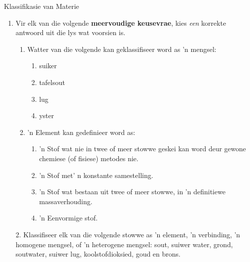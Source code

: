 \label{m38706*secfhsst!!!underscore!!!id672}
            \begin{eocexercises}{Klassifikasie van Materie}{
            \nopagebreak
      \label{m38706*id67920}\begin{enumerate}[noitemsep, label=\textbf{\arabic*}. ] 
            \label{m38706*uid133}\item Vir elk van die volgende \textbf{meervoudige keusevrae}, kies \textsl{een} korrekte
          antwoord uit die lys wat voorsien is.
\label{m38706*id67947}\begin{enumerate}[noitemsep, label=\textbf{\alph*}. ] 
            \label{m38706*uid134}\item Watter van die volgende kan geklassifiseer word as 'n mengsel:
\label{m38706*id67963}\begin{enumerate}[noitemsep, label=\textbf{\roman*}. ] 
            \label{m38706*uid135}\item suiker
\label{m38706*uid136}\item tafelsout
\label{m38706*uid137}\item lug
\label{m38706*uid138}\item yster
\end{enumerate}
                \label{m38706*uid139}\item 'n Element kan gedefinieer word as:
\label{m38706*id68029}\begin{enumerate}[noitemsep, label=\textbf{\roman*}.] 
            \label{m38706*uid140}\item 'n Stof wat nie in twee of meer stowwe geskei kan word deur gewone chemiese (of fisiese) metodes nie.
\label{m38706*uid141}\item 'n Stof met' n konstante samestelling.
\label{m38706*uid142}\item 'n Stof wat bestaan uit twee of meer stowwe, in 'n definitiewe massaverhouding.
\label{m38706*uid143}\item 'n Eenvormige stof.
\end{enumerate}
                \end{enumerate}
       2. Klassifiseer elk van die volgende stowwe as 'n element, 'n verbinding, 'n 
          homogene mengsel, of 'n heterogene mengsel: sout, suiwer water, grond, soutwater,
           suiwer lug, koolstofdioksied, goud en brons.


\end{enumerate}}
\end{eocexercises}
